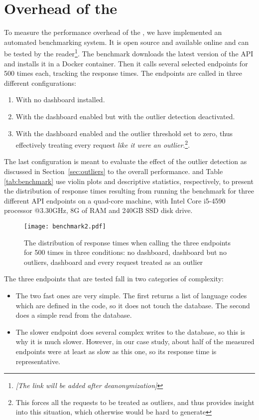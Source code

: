   
\newpage
\section{Overhead of the \tool}
\label{sec:overhead}

To measure the performance overhead of the \tool, we have implemented an automated benchmarking system. It is open source and available online and can be tested by the reader\footnote{\em [The link will be added after deanonymization]}. The benchmark downloads the latest version of the \zee API and installs it in a Docker container. Then it calls several selected endpoints for 500 times each, tracking the response times. The endpoints are called in three different configurations: 

	\begin{enumerate}
		\item With no dashboard installed.
		\item With the dashboard enabled but with the outlier detection deactivated.
		\item With the dashboard enabled and the outlier threshold set to zero, thus effectively treating every request {\em like it were an outlier}.\footnote{This forces all the requests to be treated as outliers, and thus provides insight into this situation, which otherwise would be hard to generate}.
	\end{enumerate}

The last configuration is meant to evaluate the effect of the outlier detection as discussed in Section~\ref{sec:outliers} to the overall performance.
%
 and Table \ref{tab:benchmark} use violin plots and descriptive statistics, respectively, to present the distribution of response times resulting from running the benchmark for three different API endpoints on a quad-core machine, with Intel Core i5-4590 processor @3.30GHz, 8G of RAM and 240GB SSD disk drive.


\begin{figure}[h!]
	\centering
	\texttt{[image: benchmark2.pdf]}
	\caption{The distribution of response times when calling the three endpoints for 500 times in three conditions: no dashboard, dashboard but no outliers, dashboard and every request treated as an outlier}
	\label{fig:bench}
\end{figure}




	The three endpoints that are tested fall in two categories of complexity: 
	\begin{itemize}
		\item The two fast ones are very simple. 
		The first returns a list of language codes which are defined in the code, so it does not touch the \zee database. The second does a simple read from the database. 
		\item The slower endpoint does several complex writes to the database, so this is why it is much slower. However, in our case study, about half of the measured endpoints were at least as slow as this one, so its response time is representative.
	\end{itemize}

